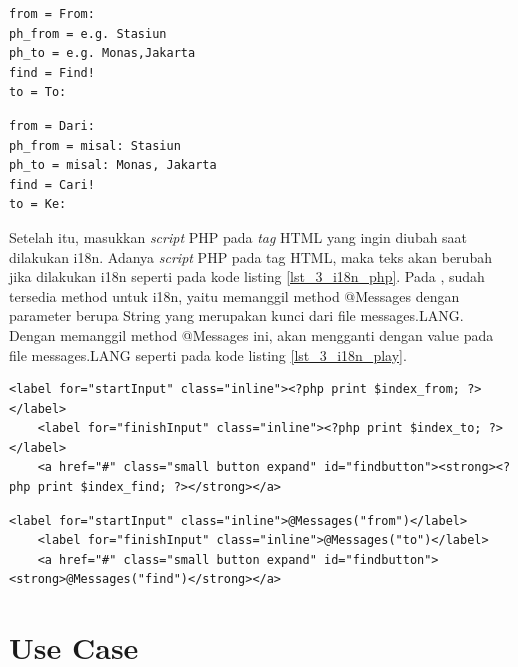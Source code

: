 \begin{lstlisting}[caption=Script \play untuk Bahasa Inggris,label = {lst_3_i18n_play_en}]
from = From:
ph_from = e.g. Stasiun
ph_to = e.g. Monas,Jakarta
find = Find!
to = To:
\end{lstlisting}


\begin{lstlisting}[caption=Script \play untuk Bahasa Indonesia,label = {lst_3_i18n_play_id}]
from = Dari:
ph_from = misal: Stasiun
ph_to = misal: Monas, Jakarta
find = Cari!
to = Ke:
\end{lstlisting}

Setelah itu, masukkan \textit{script} PHP pada \textit{tag} HTML yang ingin diubah saat dilakukan i18n. Adanya \textit{script} PHP pada tag HTML, maka teks akan berubah jika dilakukan i18n seperti pada kode listing \ref{lst_3_i18n_php}. Pada \play, sudah tersedia method untuk i18n, yaitu memanggil method @Messages dengan parameter berupa String yang merupakan kunci dari file messages.LANG. Dengan memanggil method @Messages ini, akan mengganti dengan value pada file messages.LANG seperti pada kode listing \ref{lst_3_i18n_play}.

\begin{lstlisting}[caption=Script PHP untuk Internationalization,label = {lst_3_i18n_php}]
	<label for="startInput" class="inline"><?php print $index_from; ?></label>
	<label for="finishInput" class="inline"><?php print $index_to; ?></label>
	<a href="#" class="small button expand" id="findbutton"><strong><?php print $index_find; ?></strong></a>
\end{lstlisting}

\begin{lstlisting}[caption=Script \play untuk Internationalization,label = {lst_3_i18n_play}]
	<label for="startInput" class="inline">@Messages("from")</label>
	<label for="finishInput" class="inline">@Messages("to")</label>
	<a href="#" class="small button expand" id="findbutton"><strong>@Messages("find")</strong></a>
\end{lstlisting}



\section{Use Case}
\label{sec:usecase}

